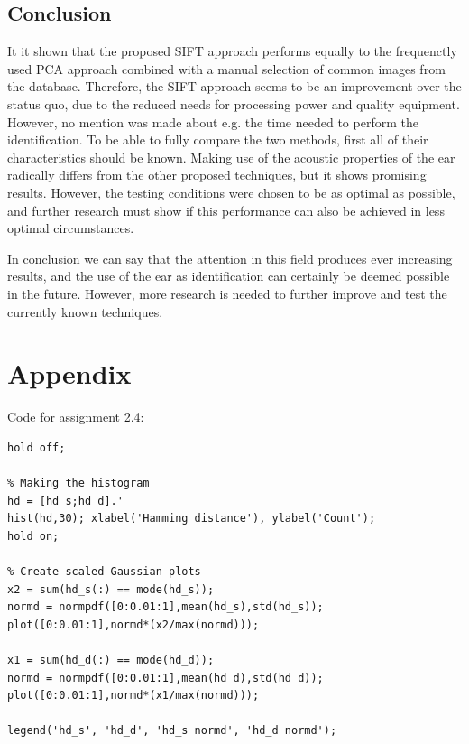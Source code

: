 \documentclass{article}
\begin{document}
\subsection{Conclusion}
It it shown that the proposed SIFT approach performs equally to the frequenctly used PCA approach combined with a manual selection of common images from the database.
Therefore, the SIFT approach seems to be an improvement over the status quo, due to the reduced needs for processing power and quality equipment.
However, no mention was made about e.g. the time needed to perform the identification. 
To be able to fully compare the two methods, first all of their characteristics should be known.
Making use of the acoustic properties of the ear radically differs from the other proposed techniques, 
but it shows promising results.
However, the testing conditions were chosen to be as optimal as possible, and further research must show if this performance can also be achieved 
in less optimal circumstances.

In conclusion we can say that the attention in this field produces ever increasing results, 
and the use of the ear as identification can certainly be deemed possible in the future.
However, more research is needed to further improve and test the currently known techniques.
\newpage



\section*{Appendix}
Code for assignment 2.4:
\begin{lstlisting}
hold off;

% Making the histogram
hd = [hd_s;hd_d].'
hist(hd,30); xlabel('Hamming distance'), ylabel('Count');
hold on;

% Create scaled Gaussian plots
x2 = sum(hd_s(:) == mode(hd_s));
normd = normpdf([0:0.01:1],mean(hd_s),std(hd_s));
plot([0:0.01:1],normd*(x2/max(normd)));

x1 = sum(hd_d(:) == mode(hd_d));
normd = normpdf([0:0.01:1],mean(hd_d),std(hd_d));
plot([0:0.01:1],normd*(x1/max(normd)));

legend('hd_s', 'hd_d', 'hd_s normd', 'hd_d normd');
\end{lstlisting}
\end{document}
